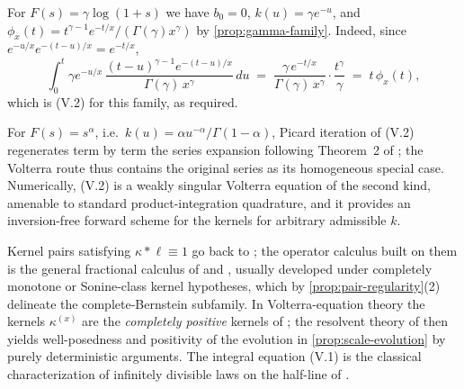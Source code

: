 \begin{example}\label{ex:gamma-volterra}
For $F(s) = \gamma\log(1+s)$ we have $b_0 = 0$, $k(u) = \gamma e^{-u}$, and
$\phi_x(t) = t^{\gamma-1}e^{-t/x}/(\Gamma(\gamma)x^\gamma)$ by \ref{prop:gamma-family}.
Indeed, since $e^{-u/x}e^{-(t-u)/x} = e^{-t/x}$,
\[
  \int_0^t \gamma e^{-u/x}\,\frac{(t-u)^{\gamma-1} e^{-(t-u)/x}}{\Gamma(\gamma)\,x^{\gamma}}\,du
  \;=\; \frac{\gamma\, e^{-t/x}}{\Gamma(\gamma)\,x^{\gamma}} \cdot \frac{t^{\gamma}}{\gamma}
  \;=\; t\,\phi_x(t),
\]
which is (V.2) for this family, as required.
\end{example}

\begin{remark}\label{rem:volterra-computation}
For $F(s) = s^\alpha$, i.e.\ $k(u) = \alpha u^{-\alpha}/\Gamma(1-\alpha)$, Picard iteration of
(V.2) regenerates term by term the series expansion following Theorem~2 of
; the Volterra route thus contains the original series as its
homogeneous special case. Numerically, (V.2) is a weakly singular Volterra equation of the
second kind, amenable to standard product-integration quadrature, and it provides an
inversion-free forward scheme for the kernels for arbitrary admissible $k$.
\end{remark}

\begin{remark}[literature]\label{rem:sonine-literature}
Kernel pairs satisfying $\kappa * \ell \equiv 1$ go back to ; the
operator calculus built on them is the general fractional calculus of
 and , usually developed under
completely monotone or Sonine-class kernel hypotheses, which by
\ref{prop:pair-regularity}(2) delineate the complete-Bernstein subfamily. In
Volterra-equation theory the kernels $\kappa^{(x)}$ are the \emph{completely positive} kernels
of ; the resolvent theory of  then
yields well-posedness and positivity of the evolution in \ref{prop:scale-evolution} by purely
deterministic arguments. The integral equation (V.1) is the classical characterization of
infinitely divisible laws on the half-line of .
\end{remark}

